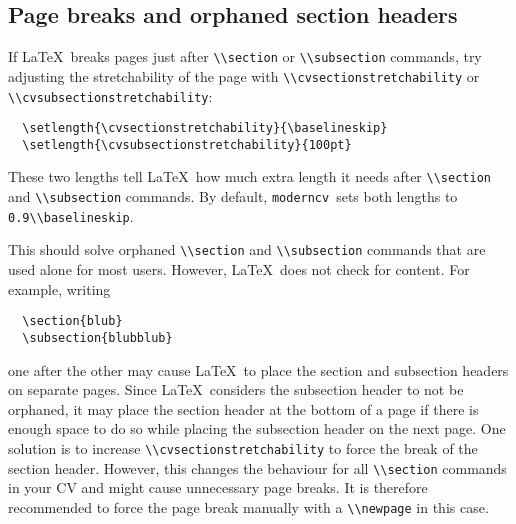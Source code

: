 \documentclass[a4paper, 11pt]{article}
\newcommand{\code}[1]{\lstinline!#1!}
\newcommand{\moderncv}{\code{moderncv}}
\newcommand{\Moderncv}{\moderncv~}
\newcommand{\Latex}{\LaTeX~}
\begin{document}
\subsection{Page breaks and orphaned section headers}
If \Latex breaks pages just after \code{\\section} or \code{\\subsection} commands, try adjusting the stretchability of the page with \code{\\cvsectionstretchability} or \code{\\cvsubsectionstretchability}:
\begin{lstlisting}
  \setlength{\cvsectionstretchability}{\baselineskip}
  \setlength{\cvsubsectionstretchability}{100pt}
\end{lstlisting}
These two lengths tell \Latex how much extra length it needs after \code{\\section} and \code{\\subsection} commands.
By default, \Moderncv sets both lengths to \code{0.9\\baselineskip}.

This should solve orphaned \code{\\section} and \code{\\subsection} commands that are used alone for most users.
However, \Latex does not check for content.
For example, writing
\begin{lstlisting}
  \section{blub}
  \subsection{blubblub}
\end{lstlisting}
one after the other may cause \Latex to place the section and subsection headers on separate pages.
Since \Latex considers the subsection header to not be orphaned, it may place the section header at the bottom of a page if there is enough space to do so while placing the subsection header on the next page.
One solution is to increase \code{\\cvsectionstretchability} to force the break of the section header.
However, this changes the behaviour for all \code{\\section} commands in your CV and might cause unnecessary page breaks.
It is therefore recommended to force the page break manually with a \code{\\newpage} in this case.
\end{document}
